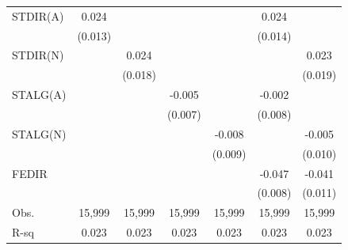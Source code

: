 {\begin{tabular}{l*{6}{c}}
STDIR(A)            &       0.024\sym{*}  &                     &                     &                     &       0.024\sym{*}  &                     \\
                    &     (0.013)         &                     &                     &                     &     (0.014)         &                     \\
\addlinespace
STDIR(N)            &                     &       0.024         &                     &                     &                     &       0.023         \\
                    &                     &     (0.018)         &                     &                     &                     &     (0.019)         \\
\addlinespace
STALG(A)            &                     &                     &      -0.005         &                     &      -0.002         &                     \\
                    &                     &                     &     (0.007)         &                     &     (0.008)         &                     \\
\addlinespace
STALG(N)            &                     &                     &                     &      -0.008         &                     &      -0.005         \\
                    &                     &                     &                     &     (0.009)         &                     &     (0.010)         \\
\addlinespace
FEDIR               &                     &                     &                     &                     &      -0.047\sym{***}&      -0.041\sym{***}\\
                    &                     &                     &                     &                     &     (0.008)         &     (0.011)         \\
\midrule
Obs.                &      15,999         &      15,999         &      15,999         &      15,999         &      15,999         &      15,999         \\
R-sq                &       0.023         &       0.023         &       0.023         &       0.023         &       0.023         &       0.023         \\
\bottomrule
\end{tabular}
}
